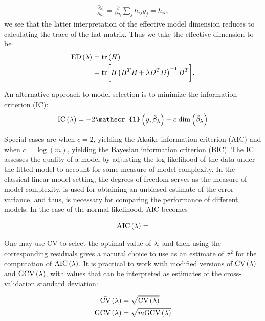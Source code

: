 \documentclass[12pt]{article}
\newcommand*\needsparaphrased{\color{red}}
\theoremstyle{definition}
\begin{document}
\begin{align*}
\frac{\partial \hat{y_i}}{\partial y_i} = \frac{\partial }{\partial y_i} \sum_{j} h_{ij} y_j = h_{ii},
\end{align*}
\noindent
we see that the latter interpretation of the effective model dimension reduces to calculating the trace of the hat matrix. Thus we take the effective dimension to be 
\begin{align}
\textup{ED}\left(\lambda\right) &= \textup{tr}\left(H\right) \nonumber \\
&= \textup{tr}\bigg[ B\left( B^T B + \lambda D^T D \right)^{-1} B^T\bigg], \label{eq:hat_matrix_trace}
\end{align}


{
\needsparaphrased{
[ INSERT PROOF HERE.]
}
}

An alternative approach to model selection is to minimize the information criterion (IC):
\[
\textup{IC}\left(\lambda\right) = -2\mathscr{l}\left(y, \hat{\beta}_\lambda \right) + c\; \textup{dim}\left(\hat{\beta}_\lambda\right)
\]

Special cases are when $c=2$, yielding the Akaike information criterion (AIC) and when $c=\log\left(m\right)$, yielding the Bayesian information criterion (BIC). The IC assesses the quality of a model by adjusting the log likelihood of the data under the fitted model to account for some measure of model complexity. In the classical linear model setting, the degrees of freedom serves as the measure of model complexity, is used for obtaining an unbiased estimate of the error variance, and thus, is necessary for comparing the performance of different models. In the case of the normal likelihood, AIC becomes

\begin{equation} \label{eq:univariate_AIC}
\textup{AIC}\left(\lambda\right) = %
\end{equation}

One may use CV to select the optimal value of $\lambda$, and then using the corresponding residuals gives a natural choice to use as an estimate of $\sigma^2$ for the computation of $\textup{AIC}\left(\lambda\right)$. It is practical to work with modified versions of $\textup{CV}\left(\lambda\right)$ and $\textup{GCV}\left(\lambda\right)$, with values that can be interpreted as estimates of the cross-validation standard deviation:

\begin{equation}
\begin{split}
\bar{\textup{CV}}\left(\lambda\right) &= \sqrt{\textup{CV}\left(\lambda\right)} \\
\bar{\textup{GCV}}\left(\lambda\right) &= \sqrt{m\textup{GCV}\left(\lambda\right)} \\
\end{split}
\end{equation}
\end{document}
